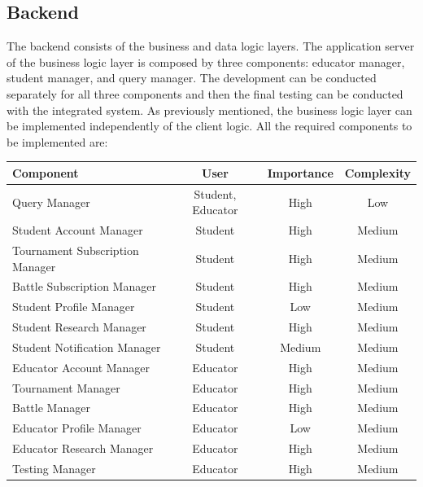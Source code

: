 \documentclass[12pt, a4paper]{report}
\begin{document}
    \subsection{Backend}
    The backend consists of the business and data logic layers. 
    The application server of the business logic layer is composed by three components: educator manager, student manager, and query manager. 
    The development can be conducted separately for all three components and then the final testing can be conducted with the integrated system. 
    As previously mentioned, the business logic layer can be implemented independently of the client logic. 
    All the required components to be implemented are: 
    \begin{table}[H]
        \begin{tabular}{lccc}
        \hline
        \textbf{Component}              & \textbf{User}     & \textbf{Importance} & \textbf{Complexity} \\ \hline
        Query Manager                   & Student, Educator & High                & Low                 \\
        Student Account Manager         & Student           & High                & Medium              \\
        Tournament Subscription Manager & Student           & High                & Medium              \\
        Battle Subscription Manager     & Student           & High                & Medium              \\
        Student Profile Manager         & Student           & Low                 & Medium              \\
        Student Research Manager        & Student           & High                & Medium              \\
        Student Notification Manager    & Student           & Medium              & Medium              \\
        Educator Account Manager        & Educator          & High                & Medium              \\
        Tournament Manager              & Educator          & High                & Medium              \\
        Battle Manager                  & Educator          & High                & Medium              \\
        Educator Profile Manager        & Educator          & Low                 & Medium              \\
        Educator Research Manager       & Educator          & High                & Medium              \\ 
        Testing Manager                 & Educator          & High                & Medium              \\ \hline
        \end{tabular}
    \end{table}
\end{document}
